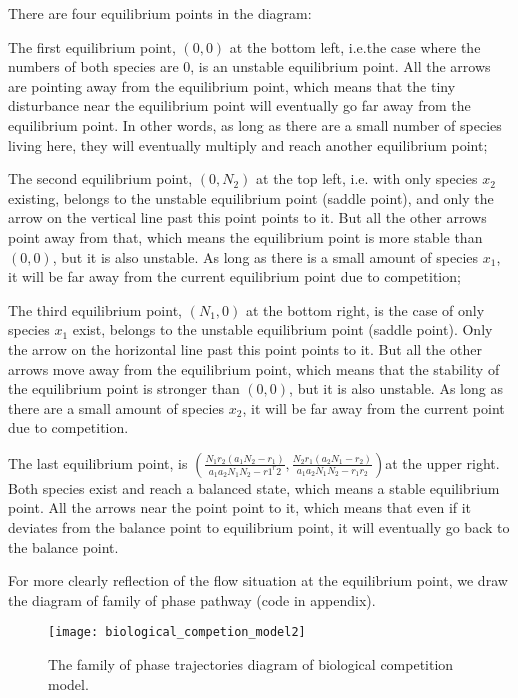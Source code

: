 \documentclass{mcmthesis}
\begin{document}
There are four equilibrium points in the diagram:

The first equilibrium point,  $ (0,0) $ at the bottom left, i.e.the case where the numbers of both species are 0, is an unstable equilibrium point. All the arrows are pointing away from the equilibrium point, which means that the tiny disturbance near the equilibrium point will eventually go far away from the equilibrium point. In other words, as long as there are a small number of species living here, they will eventually multiply and reach another equilibrium point;

The second equilibrium point,  $(0,N_2) $ at the top left, i.e. with only species  $ x_2 $ existing, belongs to the unstable equilibrium point (saddle point), and only the arrow on the vertical line past this point points to it. But all the other arrows point away from that, which means the equilibrium point is more stable than $ (0,0) $, but it is also unstable. As long as there is a small amount of species $ x_1 $, it will be far away from the current equilibrium point due to competition;

The third equilibrium point, $ (N_1,0) $ at the bottom right, is the case of only species $ x_1 $ exist, belongs to the unstable equilibrium point (saddle point). Only the arrow on the horizontal line past this point points to it. But all the other arrows move away from the equilibrium point, which means that the stability of the equilibrium point is stronger than $ (0,0) $, but it is also unstable. As long as there are a small amount of species $ x_2 $, it will be far away from the current point due to competition. 

The last equilibrium point, is $ \left(\frac{N_{1} r_{2}\left(a_{1} N_{2}-r_{1}\right)}{a_{1} a_{2} N_{1} N_{2}-r 1^{r} 2}, \frac{N_{2} r_{1}\left(a_{2} N_{1}-r_{2}\right)}{a_{1} a_{2} N_{1} N_{2}-r_{1} r_{2}}\right)$at the upper right.  Both species exist and reach a balanced state, which means a stable equilibrium point. All the arrows near the point point to it, which means that even if it deviates from the balance point to equilibrium point, it will eventually go back to the balance point.

For more clearly reflection of the flow situation at the equilibrium point, we draw the diagram of family of phase pathway (code in appendix).

\begin{figure}[H]
  \small
  \centering
  \texttt{[image: biological\_competion\_model2]}
  \caption{The family of phase trajectories diagram of biological competition model.}
  \label{biological_competion_model2}
\end{figure}
\end{document}
